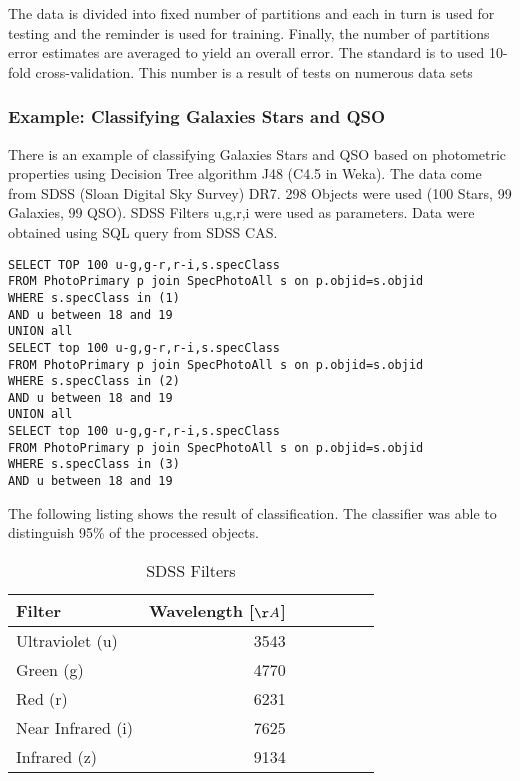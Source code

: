 The data is divided into fixed number of partitions and each in turn
is used for testing and the reminder is used for training. Finally,
the number of partitions error estimates are averaged to yield an
overall error. The standard is to used 10-fold cross-validation. This
number is a result of tests on numerous data sets \cite{witten2005data}

\subsubsection{Example: Classifying Galaxies Stars and QSO}
There is an example of classifying Galaxies Stars and QSO based on
photometric properties using Decision Tree algorithm J48 (C4.5 in
Weka). The data come from SDSS (Sloan Digital Sky Survey) DR7. 298
Objects were used (100 Stars, 99 Galaxies, 99 QSO). SDSS Filters
u,g,r,i were used as parameters. Data were obtained using SQL query
from SDSS CAS.

\begin{lstlisting}
SELECT TOP 100 u-g,g-r,r-i,s.specClass
FROM PhotoPrimary p join SpecPhotoAll s on p.objid=s.objid 
WHERE s.specClass in (1)
AND u between 18 and 19
UNION all
SELECT top 100 u-g,g-r,r-i,s.specClass
FROM PhotoPrimary p join SpecPhotoAll s on p.objid=s.objid 
WHERE s.specClass in (2)
AND u between 18 and 19
UNION all
SELECT top 100 u-g,g-r,r-i,s.specClass
FROM PhotoPrimary p join SpecPhotoAll s on p.objid=s.objid 
WHERE s.specClass in (3)
AND u between 18 and 19
\end{lstlisting}

The following listing shows the result of classification. The
classifier was able to distinguish 95\% of the processed objects.

\begin{table}[ht]
  \centering
  \small
     \begin{tabular}[ht]{l r@{,}l r@{,}l l l}
     \toprule
     Filter & Wavelength [$\AA$] \\
     \midrule
     Ultraviolet (u) & 3543 \\
     Green (g) & 4770\\
     Red (r) & 6231\\
     Near Infrared (i) & 7625\\
     Infrared (z) & 9134 \\
     \bottomrule
   \end{tabular}
  \caption{SDSS Filters}
  \label{tab:SDSSFilter}
\end{table}


